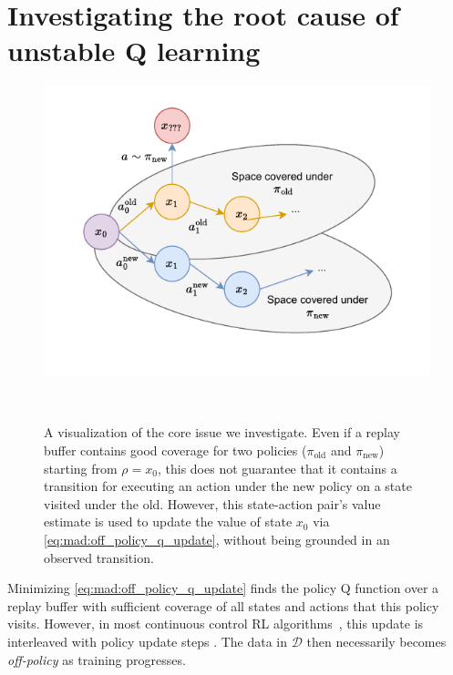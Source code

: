 \section{Investigating the root cause of unstable Q learning}


\begin{figure}[t]
\begin{minipage}{0.6\textwidth}
    \includegraphics[width=\textwidth]{illustrations/mad-td/rl_sequences.drawio.pdf}
\end{minipage}
~
\begin{minipage}{0.39\textwidth}
    \caption{A visualization of the core issue we investigate. Even if a replay buffer contains good coverage for two policies ($\pi_\mathrm{old}$ and $\pi_\mathrm{new}$) starting from $\rho=x_0$, this does not guarantee that it contains a transition for executing an action under the new policy on a state visited under the old. However, this state-action pair's value estimate is used to update the value of state $x_0$ via \autoref{eq:mad:off_policy_q_update}, without being grounded in an observed transition.}
    \label{fig:mad:coverage}
\end{minipage}
\end{figure}
    

Minimizing \autoref{eq:mad:off_policy_q_update} finds the policy Q function over a replay buffer with sufficient coverage of all states and actions that this policy visits.
However, in most continuous control RL algorithms~\parencite{ddpg,haarnoja2018sac, fujimoto2018addressing}, this update is interleaved with policy update steps .
The data in $\mathcal{D}$ then necessarily becomes \emph{off-policy} as training progresses. 

